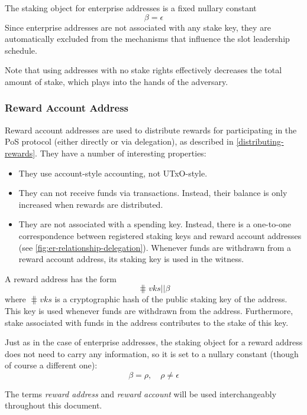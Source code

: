 \documentclass[11pt,a4paper]{article}
\begin{document}
The staking object for enterprise addresses is a fixed nullary constant
\[
\beta = \epsilon
\]
Since enterprise addresses are not associated with any stake key, they
are automatically excluded from the mechanisms that influence the slot
leadership schedule.

Note that using addresses with no stake rights effectively decreases
the total amount of stake, which plays into the hands of the adversary.

\subsubsection{Reward Account Address}
\label{reward-address}

Reward account addresses are used to distribute rewards for participating in
the PoS protocol (either directly or via delegation), as described in
\ref{distributing-rewards}. They have a number of interesting
properties:

\begin{itemize}
\item They use account-style accounting, not UTxO-style.
\item They can not receive funds via transactions. Instead, their
  balance is only increased when rewards are distributed.
\item They are not associated with a spending key. Instead, there is a
  one-to-one correspondence between registered staking keys and reward
  account addresses (see \cref{fig:er-relationship-delegation}). Whenever funds
  are withdrawn from a reward account address, its staking key is used in the
  witness.
\end{itemize}

A reward address has the form
\[
\hash{vks} \mathbin{||} \beta
\]
where \(\hash{vks}\) is a cryptographic hash of the public staking key
of the address. This key is used whenever funds are withdrawn from the
address. Furthermore, stake associated with funds in the address
contributes to the stake of this key.

Just as in the case of enterprise addresses, the staking object for a reward
address does not need to carry any information, so it is set to a
nullary constant (though of course a different one):
\[
\beta = \rho, \quad \rho \neq \epsilon
\]

The terms \emph{reward address} and \emph{reward account} will be used
interchangeably throughout this document.
\end{document}
